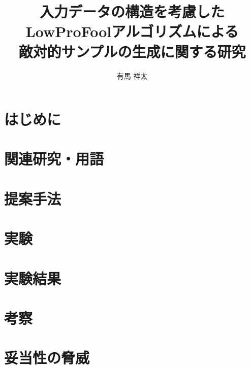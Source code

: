 \documentclass[12pt,uplatex]{jsarticle}   %
\title{入力データの構造を考慮したLowProFoolアルゴリズムによる\\敵対的サンプルの生成に関する研究}
\author{有馬 祥太}
\begin{document}
%
%
\titlepage
\jabstractpage
%
%
\tableofcontents
\newpage


\section{はじめに}


\section{関連研究・用語}


\section{提案手法}


\section{実験}


\section{実験結果}


\section{考察}


\section{妥当性の脅威}

\end{document}
